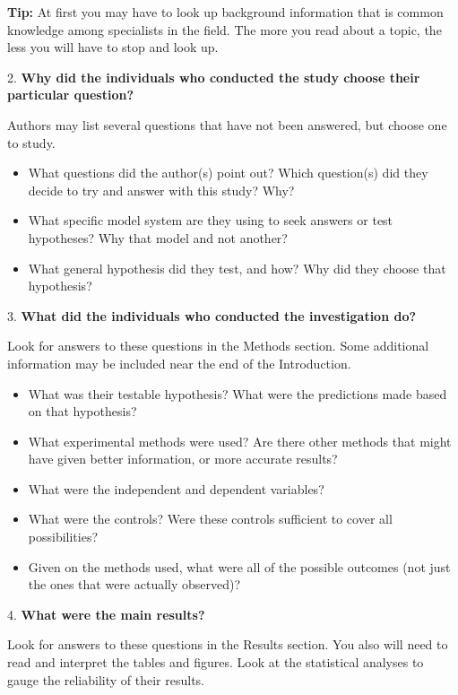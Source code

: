 \documentclass[
]{book}
\providecommand{\tightlist}{%
  \setlength{\itemsep}{0pt}\setlength{\parskip}{0pt}}
\begin{document}
\textbf{Tip:} At first you may have to look up background information that is common knowledge among specialists in the field. The more you read about a topic, the less you will have to stop and look up.

2. \textbf{Why did the individuals who conducted the study choose their particular question?}

Authors may list several questions that have not been answered, but choose one to study.

\begin{itemize}
\tightlist
\item
  What questions did the author(s) point out? Which question(s) did they decide to try and answer with this study? Why?
\item
  What specific model system are they using to seek answers or test hypotheses? Why that model and not another?
\item
  What general hypothesis did they test, and how? Why did they choose that hypothesis?
\end{itemize}

3. \textbf{What did the individuals who conducted the investigation do?}

Look for answers to these questions in the Methods section. Some additional information may be included near the end of the Introduction.

\begin{itemize}
\tightlist
\item
  What was their testable hypothesis? What were the predictions made based on that hypothesis?
\item
  What experimental methods were used? Are there other methods that might have given better information, or more accurate results?
\item
  What were the independent and dependent variables?
\item
  What were the controls? Were these controls sufficient to cover all possibilities?
\item
  Given on the methods used, what were all of the possible outcomes (not just the ones that were actually observed)?
\end{itemize}

4. \textbf{What were the main results?}

Look for answers to these questions in the Results section. You also will need to read and interpret the tables and figures. Look at the statistical analyses to gauge the reliability of their results.
\end{document}
